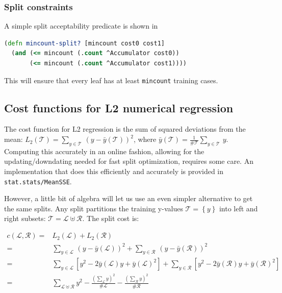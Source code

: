\documentclass[11pt,openany,american,usenames,dvipsnames,svgnames,x11names,table,isodate]{article}
\numberwithin{equation}{section}
\numberwithin{figure}{section}
\begin{document}
\subsubsection{Split constraints}

A simple split acceptability predicate is shown in

\begin{minipage}[t]{1\columnwidth}%
\begin{lstlisting}[caption={Minimum amount of training data in a leaf},label={lis:mincount-split},language=clojure,tabsize=2]
(defn mincount-split? [mincount cost0 cost1]
  (and (<= mincount (.count ^Accumulator cost0))
       (<= mincount (.count ^Accumulator cost1)))) 
\end{lstlisting}
%
\end{minipage}

This will ensure that every leaf has at least \texttt{mincount} training
cases.

\subsection{Cost functions for L2 numerical regression}

The cost function for L2 regression is the sum of squared deviations
from the mean: $L_{2}\left(\mathcal{T}\right)=\sum_{y\in\mathcal{T}}\,\left(y-\bar{y}\left(\mathcal{T}\right)\right)^{2}$,
where $\bar{y}\left(\mathcal{T}\right)=\frac{1}{\#\mathcal{T}}\sum_{y\in\mathcal{T}}\,y$.
Computing this accurately in an online fashion, allowing for the updating/downdating
needed for fast split optimization, requires some care. An implementation
that does this efficiently and accurately is provided in \texttt{stat.stats/MeanSSE}.

However, a little bit of algebra will let us use an even simpler alternative
to get the same splits. Any split partitions the training y-values
$\mathcal{T=}\left\{ y\right\} $ into left and right subsets: $\mathcal{T}=\mathcal{L}\uplus\mathcal{R}$.
The split cost is:

\begin{align*}
c\left(\mathcal{L},\mathcal{R}\right)= & L_{2}\left(\mathcal{L}\right)+L_{2}\left(\mathcal{R}\right)\\
= & \sum_{y\in\mathcal{L}}\,\left(y-\bar{y}\left(\mathcal{L}\right)\right)^{2}+\sum_{y\in\mathcal{R}}\,\left(y-\bar{y}\left(\mathcal{R}\right)\right)^{2}\\
= & \sum_{y\in\mathcal{L}}\left[y^{2}-2\bar{y}\left(\mathcal{L}\right)y+\bar{y}\left(\mathcal{L}\right)^{2}\right]+\sum_{y\in\mathcal{R}}\left[y^{2}-2\bar{y}\left(\mathcal{R}\right)y+\bar{y}\left(\mathcal{R}\right)^{2}\right]\\
= & \sum_{\mathcal{L}\uplus\mathcal{R}}y^{2}-\frac{\left(\sum_{\mathcal{L}}y\right)^{2}}{\#\mathcal{L}}-\frac{\left(\sum_{\mathcal{R}}y\right)^{2}}{\#\mathcal{R}}
\end{align*}
\end{document}
